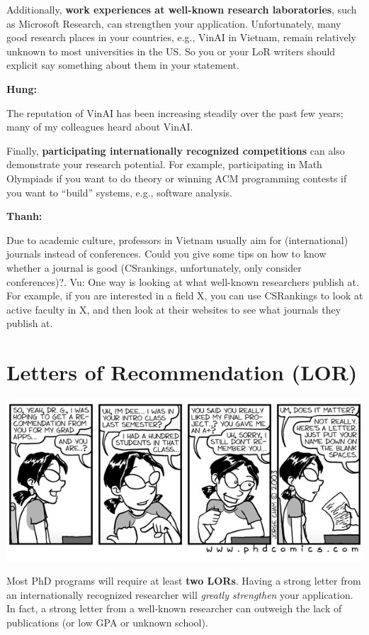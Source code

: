 \documentclass[oneside,11pt,dvipsnames]{book}
\newenvironment{commentbox}[1][]{
  \small
  \begin{mybox}
    {\small \textbf{#1}}
  }{
  \end{mybox}
}
\begin{document}
Additionally, \textbf{work experiences at well-known research laboratories}, such as Microsoft Research, can strengthen your
application.  Unfortunately, many good research places in your countries, e.g., VinAI in Vietnam, remain relatively unknown to most universities in the US. So you or your LoR writers should explicit say something about them in your statement.



\begin{commentbox}[Hung:]
  The reputation of VinAI has been increasing steadily over the past few years; many of my colleagues heard about VinAI.
\end{commentbox}

Finally, \textbf{participating internationally recognized competitions} can also demonstrate your research potential.
For example, participating in Math Olympiads if you want to do theory or  winning ACM programming contests if you want to ``build'' systems, e.g., software analysis.

\begin{commentbox}[Thanh:]
  Due to academic culture, professors in Vietnam usually aim for (international) journals instead of conferences. Could you give some tips on how to know whether a journal is good (CSrankings, unfortunately, only consider conferences)?.
  \tcblower
  Vu: One way is looking at what well-known researchers publish at. For example, if you are interested in a field X, you can use CSRankings to look at active faculty in X, and then look at their websites to see what journals they publish at.
\end{commentbox}

\section{Letters of Recommendation (LOR)}\label{sec:lor}

\begin{center}
  \includegraphics[width=0.6\linewidth]{files/c6.png}
\end{center}


Most PhD programs will require at least \textbf{two LORs}. Having a strong letter from an internationally recognized researcher will \emph{greatly strengthen} your application. In fact, a strong letter from a well-known researcher can outweigh the lack of publications (or low GPA or unknown school).
\end{document}
